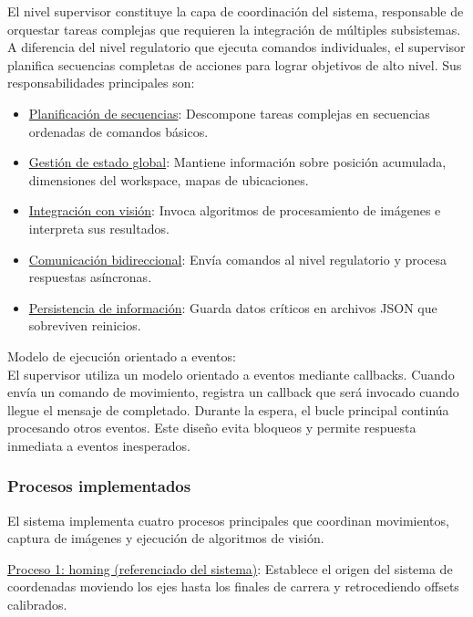 El nivel supervisor constituye la capa de coordinación del sistema, responsable de orquestar tareas complejas que requieren la integración de múltiples subsistemas. A diferencia del nivel regulatorio que ejecuta comandos individuales, el supervisor planifica secuencias completas de acciones para lograr objetivos de alto nivel. Sus responsabilidades principales son:

\begin{itemize}[label=$\bullet$]
    \item \underline{Planificación de secuencias}: Descompone tareas complejas en secuencias ordenadas de comandos básicos.
    \item \underline{Gestión de estado global}: Mantiene información sobre posición acumulada, dimensiones del workspace, mapas de ubicaciones.
    \item \underline{Integración con visión}: Invoca algoritmos de procesamiento de imágenes e interpreta sus resultados.
    \item \underline{Comunicación bidireccional}: Envía comandos al nivel regulatorio y procesa respuestas asíncronas.
    \item \underline{Persistencia de información}: Guarda datos críticos en archivos JSON que sobreviven reinicios.
\end{itemize}

Modelo de ejecución orientado a eventos:\\
\noindent
El supervisor utiliza un modelo orientado a eventos mediante callbacks. Cuando envía un comando de movimiento, registra un callback que será invocado cuando llegue el mensaje de completado. Durante la espera, el bucle principal continúa procesando otros eventos. Este diseño evita bloqueos y permite respuesta inmediata a eventos inesperados.

\subsubsection{Procesos implementados}

El sistema implementa cuatro procesos principales que coordinan movimientos, captura de imágenes y ejecución de algoritmos de visión.

\underline{Proceso 1: homing (referenciado del sistema)}: Establece el origen del sistema de coordenadas moviendo los ejes hasta los finales de carrera y retrocediendo offsets calibrados.

